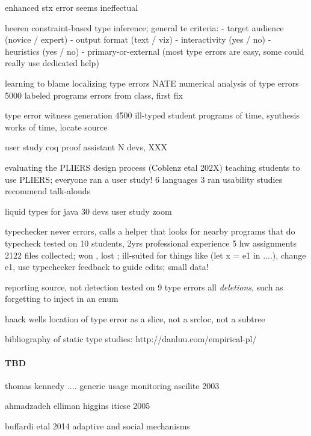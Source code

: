 \documentclass[english,submission,cleveref]{programming}
\begin{document}
\cite{dlc-citicse-2014}
enhanced stx error seems ineffectual

\cite{h-dissertiation-2005}
heeren
constraint-based type inference;
general te criteria:
- target audience (novice / expert)
- output format (text / viz)
- interactivity (yes / no)
- heuristics (yes / no)
- primary-or-external (most type errors are easy, some could really use dedicated help)

\cite{sscwj-oopsla-2017}
learning to blame localizing type errors
NATE numerical analysis of type errors
5000 labeled programs
 errors from class, first fix

\cite{sjw-jfp-2018}
type error witness generation
4500 ill-typed student programs
  of time, synthesis works
  of time, locate source

\cite{rsgl-cpp-2020}
user study coq proof assistant
N devs, XXX

\cite{cdhhjklwya-hatra-2020}
evaluating the PLIERS design process (Coblenz etal 202X)
teaching students to use PLIERS; everyone ran a user study!
6 languages
 3 ran usability studies
recommend talk-alouds

\cite{gstf-hatra-2021}
liquid types for java
30 devs user study
 zoom

\cite{lfgc-pldi-2007}
typechecker never errors,
 calls a helper that looks for nearby programs that do typecheck
tested on
 10 students, 2yrs professional experience
 5 hw assignments
 2122 files collected;
won , lost ;
ill-suited for things like (let x = e1 in ....),
 change e1,
 use typechecker feedback to guide edits;
small data!

\cite{w-popl-1986}
reporting source, not detection
tested on 9 type errors
 all \emph{deletions}, such as forgetting to inject in an enum

\cite{hw-scp-2004}
haack wells
location of type error as a slice,
 not a srcloc,
 not a subtree

bibliography of static type studies:
http://danluu.com/empirical-pl/





\paragraph{TBD}

thomas kennedy .... generic usage monitoring ascilite 2003

ahmadzadeh elliman higgins iticse 2005

buffardi etal 2014 adaptive and social mechanisms
\end{document}

